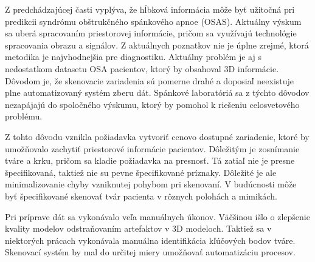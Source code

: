 Z predchádzajúcej časti vyplýva, že hĺbková informácia môže byť užitočná pri predikcii syndrómu obštrukčného spánkového apnoe (OSAS). Aktuálny výskum sa uberá spracovaním priestorovej informácie, pričom sa využívajú technológie spracovania obrazu a signálov. Z aktuálnych poznatkov nie je úplne zrejmé, ktorá metodika je najvhodnejšia pre diagnostiku. 
Aktuálny problém je aj s nedostatkom datasetu OSA pacientov, ktorý by obsahoval 3D informácie. Dôvodom je, že skenovacie zariadenia sú pomerne drahé a doposiaľ neexistuje  plne automatizovaný systém zberu dát. Spánkové laboratóriá sa z týchto dôvodov nezapájajú do spoločného výskumu, ktorý by pomohol k riešeniu celosvetového problému. \newline

Z tohto dôvodu vznikla požiadavka vytvoriť cenovo dostupné zariadenie, ktoré by umožňovalo zachytiť priestorové informácie pacientov. Dôležitým je zosnímanie tváre a krku, pričom sa kladie požiadavka na presnosť. Tá zatiaľ nie je presne špecifikovaná, taktiež nie su pevne špecifikované príznaky. Dôležité je ale minimalizovanie chyby vzniknutej pohybom pri skenovaní. V budúcnosti môže byť špecifikované skenovať tvár pacienta v rôznych polohách a mimikách. \newline

Pri príprave dát sa vykonávalo veľa manuálnych úkonov. Väčšinou išlo o zlepšenie kvality modelov odstraňovaním artefaktov v 3D modeloch. Taktiež sa v niektorých prácach vykonávala manuálna identifikácia kľúčových bodov tváre. Skenovací systém by mal do určitej miery umožňovať automatizáciu procesov. 
